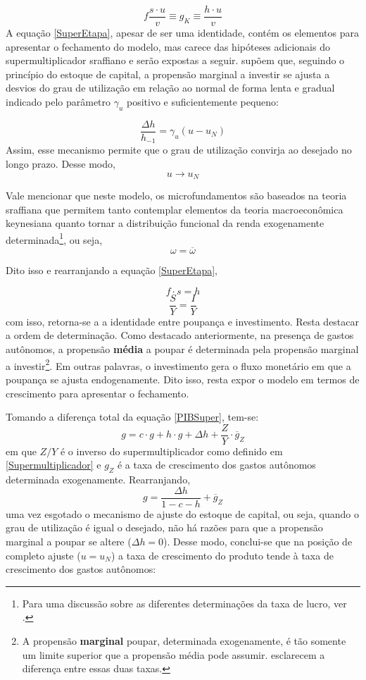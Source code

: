 \begin{equation}
\label{SuperEtapa}
f\frac{s\cdot u}{v} \equiv g_K \equiv \frac{h\cdot u}{v}    
\end{equation}
A equação \ref{SuperEtapa}, apesar de ser uma identidade, contém os elementos para apresentar o fechamento do modelo, mas carece das hipóteses adicionais do supermultiplicador sraffiano e serão expostas a seguir. \textcite{freitas_growth_2015} supõem que, seguindo o princípio do estoque de capital, a propensão marginal a investir se ajusta a desvios do grau de utilização em relação ao normal de forma lenta e gradual indicado pelo parâmetro $\gamma_u$ positivo e suficientemente pequeno:

$$
\frac{\Delta h}{h_{-1}} = \gamma_u (u - u_N)
$$
Assim, esse mecanismo permite que o grau de utilização convirja ao desejado no longo prazo. Desse modo,
$$
u \to u_N
$$

Vale mencionar que neste modelo, os microfundamentos são baseados na teoria sraffiana que permitem tanto contemplar elementos da teoria macroeconômica keynesiana quanto tornar a distribuição funcional da renda exogenamente determinada\footnote{Para uma discussão sobre as diferentes determinações da taxa de lucro, ver \textcite{serrano_teoria_1988}.}, ou seja,
$$
\omega = \overline \omega
$$

Dito isso e rearranjando a equação \ref{SuperEtapa}, 

$$
f\cdot s = h
$$
$$
\frac{S}{Y} = \frac{I}{Y}
$$
com isso, retorna-se a a identidade entre poupança e investimento. Resta destacar a ordem de determinação. Como destacado anteriormente, na presença de gastos autônomos, a propensão \textbf{média} a poupar é determinada pela propensão marginal a investir\footnote{A propensão \textbf{marginal} poupar, determinada exogenamente, é tão somente um limite superior que a propensão média pode assumir. \textcite[p.~51--52]{serrano_o_2000} esclarecem a diferença entre essas duas taxas.}. Em outras palavras, o investimento gera o fluxo monetário em que a poupança se ajusta endogenamente.
Dito isso, resta expor o modelo em termos de crescimento para apresentar o fechamento.


Tomando a diferença total da equação \ref{PIBSuper}, tem-se:
$$
g = c\cdot g + h\cdot g + \Delta h + \frac{Z}{Y}\cdot \overline g_Z
$$
em que $Z/Y$ é o inverso do supermultiplicador como definido em \ref{Supermultiplicador} e $g_Z$ é a taxa de crescimento dos gastos autônomos determinada exogenamente. Rearranjando, 
\begin{equation}
\label{crescimentosuper}
g = \frac{\Delta h}{1 - c - h} + \overline g_Z
\end{equation}
uma vez esgotado o mecanismo de ajuste do estoque de capital, ou seja, quando o grau de utilização é igual o desejado, não há razões para que a propensão marginal a poupar se altere ($\Delta h = 0$). Desse modo, conclui-se que na posição de completo ajuste ($u = u_N$) a taxa de crescimento do produto tende à taxa de crescimento dos gastos autônomos:

